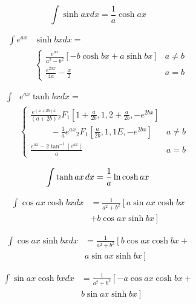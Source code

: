 \documentclass[11pt, letterpaper, notitlepage]{article}
\begin{document}
\begin{multicols}{2}
\begin{footnotesize}
\begin{equation}
\int \sinh ax dx = \frac{1}{a} \cosh ax 
\end{equation}

\begin{align}
\int e^{ax}& \sinh bx dx = \nonumber \\ &
\begin{cases}
\displaystyle{\frac{e^{ax}}{a^2-b^2} }[ -b \cosh bx + a \sinh bx ]  & a\ne b \\
\displaystyle{\frac{e^{2ax}}{4a} - \frac{x}{2}}  & a = b
\end{cases}
\end{align}

\begin{align}
\int & e^{ax} \tanh bx dx = \nonumber \\ &
\begin{cases}
\displaystyle{ \frac{ e^{(a+2b)x}}{(a+2b)} 
{_2F_1}\left[ 1+\frac{a}{2b},1,2+\frac{a}{2b}, -e^{2bx}\right] }& \\
\displaystyle{
\hspace{1cm}-\frac{1}{a}e^{ax}{_2F_1}\left[ \frac{a}{2b},1,1E, -e^{2bx}\right]
}
 & a\ne b \\
\displaystyle{\frac{e^{ax}-2\tan^{-1}[e^{ax}]}{a} } & a = b
\end{cases}
\end{align}

\begin{equation}
\int  \tanh ax\hspace{1.5pt} dx =\frac{1}{a} \ln \cosh ax 
\end{equation}

\begin{align}
\int \cos ax \cosh bx dx &= 
\frac{1}{a^2 + b^2} \left[
a \sin ax \cosh bx  \right . \nonumber \\ & \left. + b \cos ax \sinh bx
\right] 
\end{align}

\begin{align}
\int \cos ax \sinh bx dx& = 
\frac{1}{a^2 + b^2} \left[
b \cos ax \cosh bx +
\right . \nonumber \\ & \left .
 a \sin ax \sinh bx
\right] 
\end{align}

\begin{align}
\int \sin ax \cosh bx dx &= 
\frac{1}{a^2 + b^2} \left[
-a \cos ax \cosh bx +
\right . \nonumber \\ & \left .
 b \sin ax \sinh bx
\right] 
\end{align}


\end{footnotesize}
\end{multicols}
\end{document}
